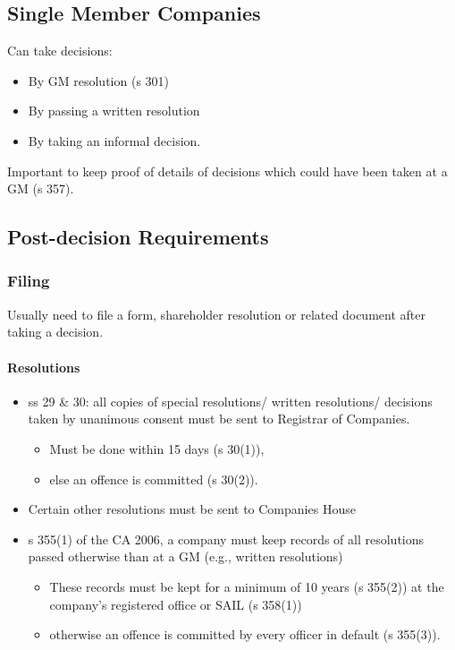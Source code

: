 \documentclass[
]{article}
\providecommand{\tightlist}{%
  \setlength{\itemsep}{0pt}\setlength{\parskip}{0pt}}
\begin{document}
\hypertarget{single-member-companies}{%
\subsection{Single Member Companies}\label{single-member-companies}}

Can take decisions:

\begin{itemize}
\tightlist
\item
  By GM resolution (s 301)
\item
  By passing a written resolution
\item
  By taking an informal decision.
\end{itemize}

Important to keep proof of details of decisions which could have been
taken at a GM (s 357).

\hypertarget{post-decision-requirements}{%
\subsection{Post-decision
Requirements}\label{post-decision-requirements}}

\hypertarget{filing}{%
\subsubsection{Filing}\label{filing}}

Usually need to file a form, shareholder resolution or related document
after taking a decision.

\hypertarget{resolutions-1}{%
\paragraph{Resolutions}\label{resolutions-1}}

\begin{itemize}
\tightlist
\item
  ss 29 \& 30: all copies of special resolutions/ written resolutions/
  decisions taken by unanimous consent must be sent to Registrar of
  Companies.

  \begin{itemize}
  \tightlist
  \item
    Must be done within 15 days (s 30(1)),
  \item
    else an offence is committed (s 30(2)).
  \end{itemize}
\item
  Certain other resolutions must be sent to Companies House
\item
  s 355(1) of the CA 2006, a company must keep records of all
  resolutions passed otherwise than at a GM (e.g., written resolutions)

  \begin{itemize}
  \tightlist
  \item
    These records must be kept for a minimum of 10 years (s 355(2)) at
    the company's registered office or SAIL (s 358(1))
  \item
    otherwise an offence is committed by every officer in default (s
    355(3)).
  \end{itemize}
\end{itemize}
\end{document}
